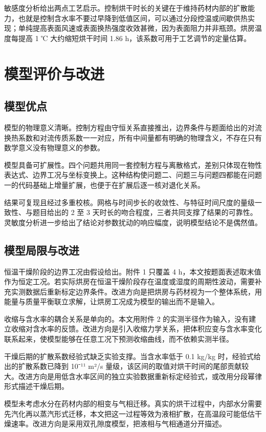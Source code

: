 \documentclass[12pt,a4paper]{article}
\begin{document}
敏感度分析给出两点工艺启示。控制烘干时长的关键在于维持药材内部的扩散能力，也就是控制含水率不要过早降到低值区间，可以通过分段控温或间歇供热实现；单纯提高表面风速或表面换热强度收效甚微，因为表面阻力并非瓶颈。烘房温度每提高 1 ℃ 大约缩短烘干时间 1.86 h，该系数可用于工艺调节的定量估算。

\section{模型评价与改进}

\subsection{模型优点}

模型的物理意义清晰。控制方程由守恒关系直接推出，边界条件与题面给出的对流换热系数和对流传质系数一一对应，所有中间量都有明确的物理含义，不存在只有数学意义没有物理意义的参数。

模型具备可扩展性。四个问题共用同一套控制方程与离散格式，差别只体现在物性表达式、边界工况与坐标变换上。这种结构使问题二、问题三与问题四都能在问题一的代码基础上增量扩展，也便于在扩展后逐一核对退化关系。

结果可复现且经过多重校核。网格与时间步长的收敛性、与特征时间尺度的量级一致性、与题目给出的 2 至 3 天时长的吻合程度，三者共同支撑了结果的可靠性。灵敏度分析进一步给出了结论对参数扰动的响应幅度，说明模型结论不是偶然值。

\subsection{模型局限与改进}

恒温干燥阶段的边界工况由假设给出。附件 1 只覆盖 4 h，本文按题面表述取末值作为恒定工况。若实际烘房在恒温干燥阶段存在温度或湿度的周期性波动，需要补充实测数据后重新标定边界条件。改进方向是把烘房与药材视为一个整体系统，用能量与质量平衡联立求解，让烘房工况成为模型的输出而不是输入。

收缩与含水率的耦合关系是单向的。本文用附件 2 的实测半径作为输入，没有建立收缩对含水率的反馈。改进方向是引入收缩力学关系，把体积应变与含水率变化联系起来，使模型能够在任意工况下预测收缩曲线，而不依赖实测半径。

干燥后期的扩散系数经验式缺乏实验支撑。当含水率低于 0.1 kg/kg 时，经验式给出的扩散系数已降到 10⁻¹¹ m²/s 量级，该区间的取值对烘干时间的尾部贡献较大。改进方向是用低含水率区间的独立实验数据重新标定经验式，或改用分段幂律形式描述干燥后期。

模型未考虑水分在药材内部的相变与气相迁移。真实的烘干过程中，内部水分需要先汽化再以蒸汽形式迁移，本文把这一过程等效为液相扩散，在高温段可能低估干燥速率。改进方向是采用双孔隙度模型，把液相与气相通道分开描述。
\end{document}

